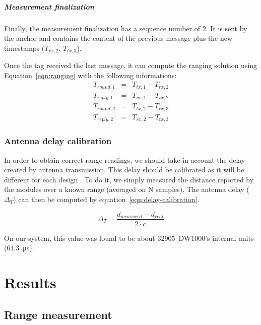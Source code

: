 \documentclass[a4paper, 12pt]{scrreprt}
\begin{document}
\paragraph{Measurement finalization}
Finally, the measurement finalization has a sequence number of 2.
It is sent by the anchor and contains the content of the previous message plus the new timestamps ($T_{rx,2}$, $T_{tx,3}$).

Once the tag received the last message, it can compute the ranging solution using Equation~\ref{eqn:ranging} with the following informations:
\begin{eqnarray*}
    T_{round,1} &=& T_{tx,1} - T_{rx,2} \\
    T_{reply,1} &=& T_{rx,1} - T_{tx,2} \\
    T_{round,2} &=& T_{tx,2} - T_{rx,3} \\
    T_{reply,2} &=& T_{rx,2} - T_{tx,3} 
\end{eqnarray*}



\subsection{Antenna delay calibration}
In order to obtain correct range readings, we should take in account the delay created by antenna transmission.
This delay should be calibrated as it will be different for each design \cite{dw1000manual}.
To do it, we simply measured the distance reported by the modules over a known range (averaged on N samples).
The antenna delay ($\Delta_T$) can then be computed by equation~\ref{eqn:delay-calibration}.

\begin{equation}
    \Delta_T = \frac{d_{measured} - d_{real}}{2\cdot c}
    \label{eqn:delay-calibration}
\end{equation}

On our system, this value was found to be about 32905~DW1000's internal units (\SI{64.3}{\micro\second}).

\chapter{Results}

\section{Range measurement}
\label{sec:range_result}

\end{document}
